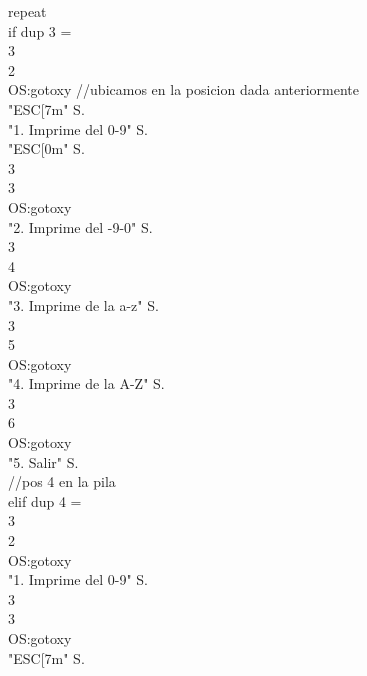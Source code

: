 \documentclass[conference]{IEEEtran}
\begin{document}
\begin{enumerate}
\begin{center}
repeat  \\ if dup 3 = \\ 3 \\ 2 \\ OS:gotoxy //ubicamos en la posicion dada anteriormente \\ "ESC[7m" S. \\ "1. Imprime del 0-9" S. \\ "ESC[0m" S. \\ 3 \\ 3 \\ OS:gotoxy \\ "2. Imprime del -9-0" S. \\ 3 \\ 4 \\ OS:gotoxy \\ "3. Imprime de la a-z" S. \\ 3 \\ 5 \\ OS:gotoxy \\ "4. Imprime de la A-Z" S. \\ 3 \\ 6 \\ OS:gotoxy \\ "5. Salir" S. \\ //pos 4 en la pila \\ elif dup 4 = \\ 3 \\ 2 \\ OS:gotoxy \\ "1. Imprime del 0-9" S. \\ 3 \\ 3 \\ OS:gotoxy \\ "ESC[7m" S. \\
	

\end{center}
\end{enumerate}
\end{document}
